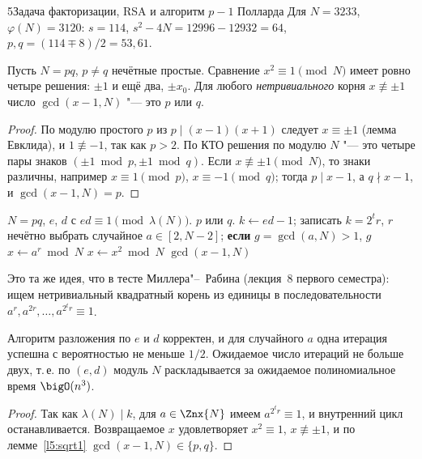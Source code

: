 \begin{lecture}{5}{Задача факторизации, RSA и алгоритм \texorpdfstring{$p - 1$}{p - 1} Полларда}
Для $N = 3233$, $\varphi(N) = 3120$: $s = 114$, $s^2 - 4N = 12996 - 12932 = 64$,
$p, q = (114 \mp 8)/2 = 53, 61$.


\begin{lemma}\label{l5:sqrt1}
Пусть $N = pq$, $p \ne q$ нечётные простые. Сравнение $x^2 \equiv 1 \pmod N$ имеет ровно
четыре решения: $\pm 1$ и ещё два, $\pm x_0$. Для любого \emph{нетривиального} корня
$x \not\equiv \pm 1$ число $\gcd(x - 1, N)$ "--- это $p$ или $q$.
\end{lemma}

\begin{proof}
По модулю простого $p$ из $p \mid (x - 1)(x + 1)$ следует $x \equiv \pm 1$ (лемма Евклида), и
$1 \not\equiv -1$, так как $p > 2$. По КТО решения по модулю $N$ "--- это четыре пары знаков
$(\pm 1 \bmod p, \pm 1 \bmod q)$. Если $x \not\equiv \pm 1 \pmod N$, то знаки различны,
например $x \equiv 1 \pmod p$, $x \equiv -1 \pmod q$; тогда $p \mid x - 1$, а $q \nmid x - 1$,
и $\gcd(x - 1, N) = p$.
\end{proof}

\begin{algorithm}[разложение $N$ по $e$ и $d$]\label{l5:factor-d}
\begin{algorithmic}[1]
\Require $N = pq$, $e$, $d$ с $ed \equiv 1 \pmod{\lambda(N)}$.
\Ensure $p$ или $q$.
\State $k \gets ed - 1$; записать $k = 2^t r$, $r$ нечётно
  \State выбрать случайное $a \in [2, N - 2]$; \textbf{если} $g = \gcd(a, N) > 1$, \Return $g$
  \State $x \gets a^r \bmod N$
     $x \gets x^2 \bmod N$ \EndWhile
     \Return $\gcd(x - 1, N)$ \EndIf
  \EndIf
\EndWhile
\end{algorithmic}
\end{algorithm}

Это та же идея, что в тесте Миллера"--~Рабина (лекция~8 первого семестра): ищем
нетривиальный квадратный корень из единицы в последовательности $a^r, a^{2r}, \dots,
a^{2^t r} \equiv 1$.

\begin{theorem}\label{l5:d-factor}
Алгоритм разложения по $e$ и $d$ корректен, и для случайного $a$ одна итерация успешна с
вероятностью не меньше $1/2$. Ожидаемое число итераций не больше двух, т.\,е. по $(e, d)$
модуль $N$ раскладывается за ожидаемое полиномиальное время $\bigO(n^3)$.
\end{theorem}

\begin{proof}
Так как $\lambda(N) \mid k$, для $a \in \Znx{N}$ имеем $a^{2^t r} \equiv 1$, и внутренний
цикл останавливается. Возвращаемое $x$ удовлетворяет $x^2 \equiv 1$,
$x \not\equiv \pm 1$, и по лемме~\ref{l5:sqrt1} $\gcd(x - 1, N) \in \{p, q\}$.


\end{proof}
\end{lecture}
